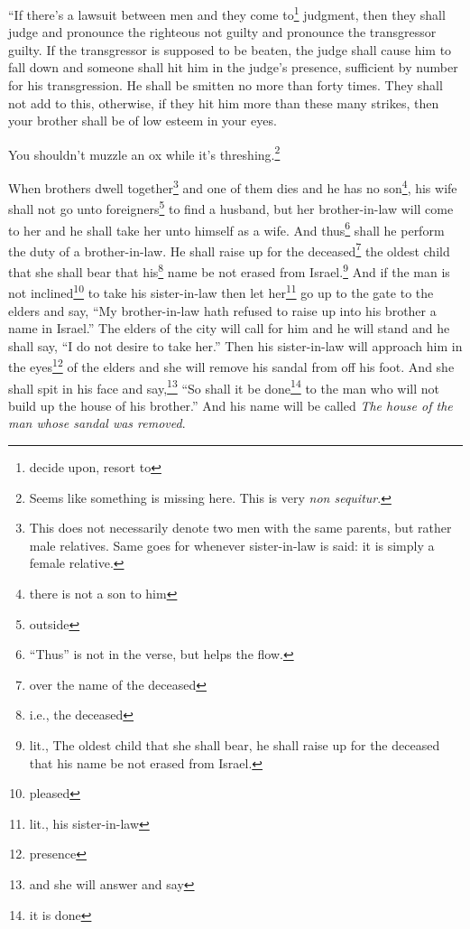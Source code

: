 
\begin{inparaenum}
     ``If there's a lawsuit between men and they come to\footnote{decide upon, resort to} judgment, then they shall judge and pronounce the righteous not guilty and pronounce the transgressor guilty.%
     If the transgressor is supposed to be beaten, the judge shall cause him to fall down and someone shall hit him in the judge's presence, sufficient by number for his transgression.%
     He shall be smitten no more than forty times. They shall not add to this, otherwise, if they hit him more than these many strikes, then your brother shall be of low esteem in your eyes.%
    
     You shouldn't muzzle an ox while it's threshing.\footnote{Seems like something is missing here. This is very \textit{non sequitur}.}%
    
     When brothers dwell together\footnote{This does not necessarily denote two men with the same parents, but rather male relatives. Same goes for whenever sister-in-law is said: it is simply a female relative.} and one of them dies and he has no son\footnote{there is not a son to him}, his wife shall not go unto foreigners\footnote{outside} to find a husband, but her brother-in-law will come to her and he shall take her unto himself as a wife. And thus\footnote{``Thus'' is not in the verse, but helps the flow.} shall he perform the duty of a brother-in-law.%
     He shall raise up for the deceased\footnote{over the name of the deceased} the oldest child that she shall bear that his\footnote{i.e., the deceased} name be not erased from Israel.\footnote{lit., The oldest child that she shall bear, he shall raise up for the deceased that his name be not erased from Israel.}%
     And if the man is not inclined\footnote{pleased} to take his sister-in-law then let her\footnote{lit., his sister-in-law} go up to the gate to the elders and say, ``My brother-in-law hath refused to raise up into his brother a name in Israel.''%
     The elders of the city will call for him and he will stand and he shall say, ``I do not desire to take her.''%
     Then his sister-in-law will approach him in the eyes\footnote{presence} of the elders and she will remove his sandal from off his foot. And she shall spit in his face and say,\footnote{and she will answer and say} ``So shall it be done\footnote{it is done} to the man who will not build up the house of his brother.''%
     And his name will be called \textit{The house of the man whose sandal was removed}.%
    

\end{inparaenum}
